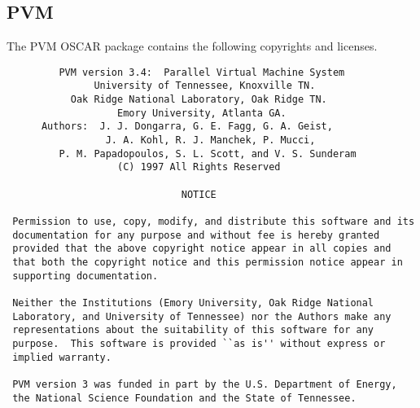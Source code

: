 %
%
%

\subsection{PVM}
The PVM OSCAR package contains the following copyrights and licenses.

\begin{verbatim}
         PVM version 3.4:  Parallel Virtual Machine System
               University of Tennessee, Knoxville TN.
           Oak Ridge National Laboratory, Oak Ridge TN.
                   Emory University, Atlanta GA.
      Authors:  J. J. Dongarra, G. E. Fagg, G. A. Geist,
                 J. A. Kohl, R. J. Manchek, P. Mucci,
         P. M. Papadopoulos, S. L. Scott, and V. S. Sunderam
                   (C) 1997 All Rights Reserved

                              NOTICE

 Permission to use, copy, modify, and distribute this software and its
 documentation for any purpose and without fee is hereby granted
 provided that the above copyright notice appear in all copies and
 that both the copyright notice and this permission notice appear in
 supporting documentation.
 
 Neither the Institutions (Emory University, Oak Ridge National
 Laboratory, and University of Tennessee) nor the Authors make any
 representations about the suitability of this software for any
 purpose.  This software is provided ``as is'' without express or
 implied warranty.
 
 PVM version 3 was funded in part by the U.S. Department of Energy,
 the National Science Foundation and the State of Tennessee.
\end{verbatim}

